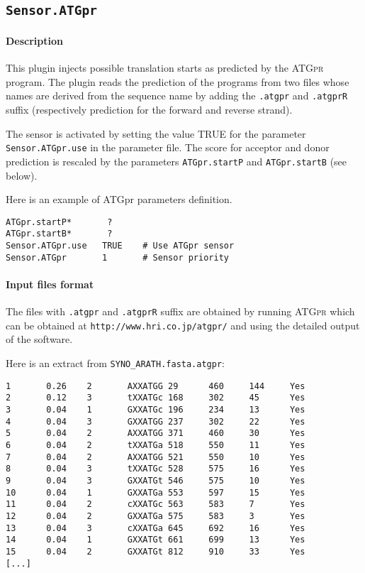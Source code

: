 
\subsection{\texttt{Sensor.ATGpr}}

\paragraph{Description}

This plugin injects possible translation starts as predicted by the
\textsc{ATGpr} program. The plugin reads the prediction of the
programs from two files whose names are derived from the sequence name
by adding the \texttt{.atgpr} and \texttt{.atgprR} suffix
(respectively prediction for the forward and reverse strand).

The sensor is activated by setting the value TRUE for the parameter
\texttt{Sensor.ATGpr.use} in the parameter file. The score for acceptor
and donor prediction is rescaled by the parameters {\tt ATGpr.startP} and
{\tt ATGpr.startB} (see below).

Here is an example of ATGpr parameters definition.
\begin{Verbatim}[fontsize=\small]
ATGpr.startP*       ?
ATGpr.startB*       ?
Sensor.ATGpr.use   TRUE    # Use ATGpr sensor
Sensor.ATGpr       1       # Sensor priority
\end{Verbatim}

\paragraph{Input files format}

The files with \texttt{.atgpr} and \texttt{.atgprR} suffix are
obtained by running \textsc{ATGpr} which can be obtained at
\texttt{http://www.hri.co.jp/atgpr/} and using the
detailed output of the software.

Here is an extract from \texttt{SYNO\_ARATH.fasta.atgpr}:
\begin{Verbatim}[fontsize=\small]
1       0.26    2       AXXATGG 29      460     144     Yes     
2       0.12    3       tXXATGc 168     302     45      Yes     
3       0.04    1       GXXATGc 196     234     13      Yes     
4       0.04    3       GXXATGG 237     302     22      Yes     
5       0.04    2       AXXATGG 371     460     30      Yes     
6       0.04    2       tXXATGa 518     550     11      Yes     
7       0.04    2       AXXATGG 521     550     10      Yes     
8       0.04    3       tXXATGc 528     575     16      Yes     
9       0.04    3       GXXATGt 546     575     10      Yes     
10      0.04    1       GXXATGa 553     597     15      Yes     
11      0.04    2       cXXATGc 563     583     7       Yes     
12      0.04    2       GXXATGa 575     583     3       Yes     
13      0.04    3       cXXATGa 645     692     16      Yes     
14      0.04    1       GXXATGt 661     699     13      Yes     
15      0.04    2       GXXATGt 812     910     33      Yes     
[...]
\end{Verbatim}

